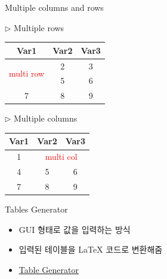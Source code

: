 \documentclass{beamer}
\begin{document}
\begin{frame}{Multiple columns and rows}
	\begin{multicols}{2}
		\noindent  
		$\triangleright$ Multiple rows
		\begin{table}[ht]
			\centering
			\begin{tabular}{ccc}
			\hline  
			Var1 & Var2 & Var3 \\ 
			\hline
			\multirow{2}{4em}{\textcolor{red}{multi row}} & 2 & 3 \\
			  & 5 & 6 \\
			7 & 8 & 9 \\
			\hline
		\end{tabular}
		\end{table} 
		
		\columnbreak
		
		$\triangleright$ Multiple columns
		\begin{table}[ht]
		\centering
		\begin{tabular}{ccc}
		\hline 
		Var1 & Var2 & Var3 \\ 
		\hline
		1 & \multicolumn{2}{c}{\textcolor{red}{multi col}} \\
		4 & 5 & 6 \\
		7 & 8 & 9 \\
		\hline
		\end{tabular}
		\end{table} 
	\end{multicols}
\end{frame}

\begin{frame}{Tables Generator}
	\begin{itemize}
		\item {
			GUI 형태로 값을 입력하는 방식
		}
		\item {
			입력된 테이블을 \textrm{\LaTeX} 코드로 변환해줌
		}
		\item {
			\href{https://www.tablesgenerator.com/}{\underline{Table Generator}}
		}
	\end{itemize}
\end{frame}
\end{document}
